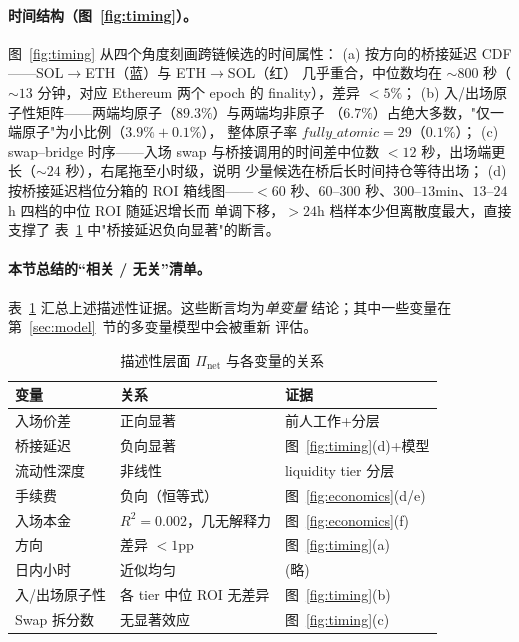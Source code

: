 \documentclass[sigconf,nonacm,10pt]{acmart}
\newcommand{\Pnet}{\Pi_{\text{net}}}
\begin{document}
\paragraph{时间结构（图~\ref{fig:timing}）。} 图~\ref{fig:timing}
从四个角度刻画跨链候选的时间属性：
(a) 按方向的桥接延迟 CDF——SOL$\to$ETH（蓝）与 ETH$\to$SOL（红）
几乎重合，中位数均在 $\sim\!800$ 秒（$\sim\!13$ 分钟，对应 Ethereum
两个 epoch 的 finality），差异 $<\!5\%$；
(b) 入/出场原子性矩阵——两端均原子（$89.3\%$）与两端均非原子
（$6.7\%$）占绝大多数，"仅一端原子"为小比例（$3.9\%+0.1\%$），
整体原子率 $fully\_atomic=29$（$0.1\%$）；
(c) swap--bridge 时序——入场 swap 与桥接调用的时间差中位数
 $<\!12$ 秒，出场端更长（$\sim\!24$ 秒），右尾拖至小时级，说明
少量候选在桥后长时间持仓等待出场；
(d) 按桥接延迟档位分箱的 ROI 箱线图——$<\!60$ 秒、$60$--$300$
秒、$300$--$13$min、$13$--$24$h 四档的中位 ROI 随延迟增长而
单调下移，$>\!24$h 档样本少但离散度最大，直接支撑了
表~\ref{tab:univar} 中"桥接延迟负向显著"的断言。

\paragraph{本节总结的“相关 / 无关”清单。}
表~\ref{tab:univar} 汇总上述描述性证据。这些断言均为\emph{单变量}
结论；其中一些变量在第~\ref{sec:model}~节的多变量模型中会被重新
评估。

\begin{table}[h]
  \centering
  \small
  \caption{描述性层面 $\Pnet$ 与各变量的关系}
  \label{tab:univar}
  \begin{tabular}{lll}
    \toprule
    \textbf{变量} & \textbf{关系} & \textbf{证据} \\
    \midrule
    入场价差 & 正向显著 & 前人工作+分层 \\
    桥接延迟 & 负向显著 & 图~\ref{fig:timing}(d)+模型 \\
    流动性深度 & 非线性 & liquidity tier 分层 \\
    手续费  & 负向（恒等式） & 图~\ref{fig:economics}(d/e) \\
    入场本金 & $R^2=0.002$，几无解释力 & 图~\ref{fig:economics}(f) \\
    方向 & 差异 $<\!1$pp & 图~\ref{fig:timing}(a) \\
    日内小时 & 近似均匀 & (略) \\
    入/出场原子性 & 各 tier 中位 ROI 无差异 & 图~\ref{fig:timing}(b) \\
    Swap 拆分数 & 无显著效应 & 图~\ref{fig:timing}(c) \\
    \bottomrule
  \end{tabular}
\end{table}
\end{document}

